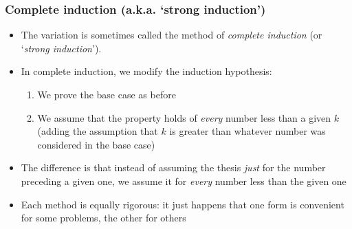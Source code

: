  \begin{frame}
\frametitle{Complete induction (a.k.a. `strong induction')}

\begin{itemize}[<+->]
\item The variation is sometimes called the method of {\emph{complete induction}} (or `{\emph{strong induction}}').

\item  In complete induction, we modify the induction hypothesis:

\begin{enumerate}

\item We prove the base case as before

\item We assume that the property holds of {\emph{every}} number less than a given $k$ (adding the assumption that $k$ is greater than whatever number was considered in the base case)

\end{enumerate}
 
\item The difference is that instead of assuming the thesis {\it{just}} for the number preceding a given one, we assume it for {\emph{every}} number less than the given one

\item Each method is equally rigorous: it just happens that one form is convenient for some problems, the other for others

\end{itemize} 
\end{frame}



